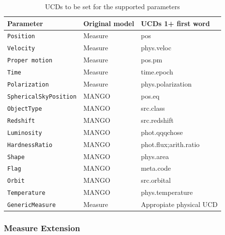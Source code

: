 \documentclass[11pt,a4paper]{ivoa}
\begin{document}
\begin{table}[ht!]
     \begin{tabular}{|p{4cm}|p{3cm}|p{3.5cm}|}
       \hline Parameter &  Original model & UCDs 1+ first word  \\
       \hline  \texttt{Position}             &  Measure  &  pos \\
       \hline  \texttt{Velocity  }            &  Measure & phys.veloc      \\
       \hline  \texttt{Proper motion}    & Measure & pos.pm    \\
       \hline  \texttt{Time}                   & Measure &  time.epoch   \\
       \hline  \texttt{Polarization}         & Measure & phys.polarization \\
       \hline  \texttt{SphericalSkyPosition}    &  MANGO  &  pos.eq \\
       \hline  \texttt{ObjectType}                   &  MANGO  & src.class \\
       \hline  \texttt{Redshift}                        &  MANGO  & src.redshift \\
       \hline  \texttt{Luminosity}                    &  MANGO  & phot.qqqchose \\
       \hline  \texttt{HardnessRatio}             &  MANGO  & phot.flux;arith.ratio \\
       \hline  \texttt{Shape}                     &  MANGO  & phys.area \\
       \hline  \texttt{Flag}                        &  MANGO  & meta.code  \\
       \hline  \texttt{Orbit}                       &  MANGO  & src.orbital \\
       \hline  \texttt{Temperature}                &  MANGO  & phys.temperature \\
       \hline  \texttt{GenericMeasure}    &  Measure  &  Appropiate physical UCD \\
       \hline
     \end{tabular}
     \caption{ UCDs to be set for the supported parameters}
     \label{tab:ucds}
 \end{table}



\subsubsection{Measure Extension}
\end{document}
